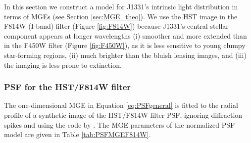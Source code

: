 \documentclass[useAMS,usenatbib]{mnras}
\begin{document}
In this section we construct a model for J1331's intrinsic light distribution in terms of MGEs (see Section \ref{sec:MGE_theo}). We use the HST image in the F814W (I-band) filter (Figure \ref{fig:F814W}) because J1331's central stellar component appears at longer wavelengths (i) smoother and more extended than in the F450W filter (Figure \ref{fig:F450W}), as it is less sensitive to young clumpy star-forming regions, (ii) much brighter than the bluish lensing images, and (iii) the imaging is less prone to extinction.

\subsubsection{PSF for the HST/F814W filter}

The one-dimensional MGE in Equation \eqref{eq:PSFgeneral} is fitted to the radial profile of a synthetic image of the HST/F814W filter PSF, ignoring diffraction spikes and using the code by \citet{Cap02}. The MGE parameters of the normalized PSF model are given in Table \ref{tab:PSFMGEF814W}.
\end{document}
